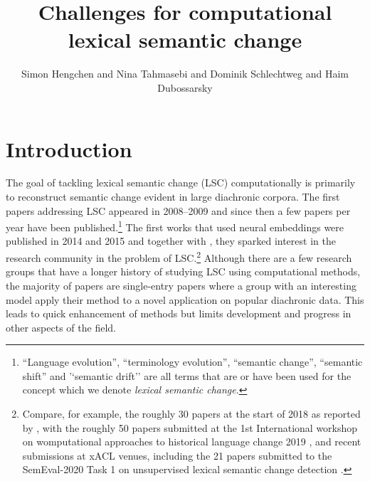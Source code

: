 \documentclass[output=paper]{langscibook}
\author{Simon Hengchen\orcid{0000-0002-8453-7221}\affiliation{University of Gothenburg} and
Nina Tahmasebi\orcid{0000-0003-1688-1845}\affiliation{University of Gothenburg} and
Dominik Schlechtweg\orcid{0000-0002-0685-2576}\affiliation{University of Stuttgart} and
Haim Dubossarsky\orcid{0000-0002-2818-6113}\affiliation{University of Cambridge}}
\title{Challenges for computational lexical semantic change}
\begin{document}
\maketitle

\section{Introduction}
\label{s:introduction}
The goal of tackling lexical semantic change (LSC) computationally is primarily to reconstruct semantic change evident in large diachronic corpora. 
The first papers addressing LSC appeared in 2008--2009 and since then a few papers per year have been published.\footnote{``Language evolution'', ``terminology evolution'', ``semantic change'', ``semantic shift'' and '`semantic drift'' are all terms that are or have been used for the concept which we denote \textit{lexical semantic change}.}
The first works that used neural embeddings were published in 2014 and 2015 \citep{kim-etal-2014-temporal, kulkarni2015statistically, dubossarsky2015bottom} and together with \citet{hamilton-etal-2016-diachronic}, they sparked interest in the research community in the problem of LSC.\footnote{Compare, for example, the roughly 30 papers at the start of 2018 as reported by \citet{tahmasebi2018survey}, with the roughly 50 papers submitted at the 1st International workshop on womputational approaches to historical language change 2019 \citep{ws-2019-international-approaches}, and recent submissions at xACL venues, including the 21 papers submitted to the SemEval-2020 Task 1 on unsupervised lexical semantic change detection \citep{schlechtweg-etal-2020-semeval}.}  
Although there are a few research groups that have a longer  history of studying LSC using computational methods, the majority of  papers are single-entry papers where a group with an interesting model apply their method to a novel application on popular diachronic data. This leads to quick enhancement of methods but limits development and progress in other aspects of the field. 
\end{document}
